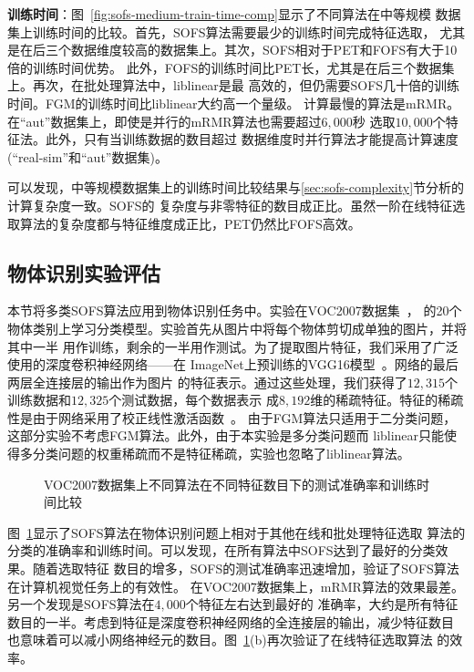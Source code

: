 \documentclass[doctor]{ustcthesis}
\newcommand{\includeMyGraphicX}[1]{\texttt{[image: \#1]}}
\begin{document}
\textbf{训练时间}：图~\ref{fig:sofs-medium-train-time-comp}显示了不同算法在中等规模
数据集上训练时间的比较。首先，SOFS算法需要最少的训练时间完成特征选取，
尤其是在后三个数据维度较高的数据集上。其次，SOFS相对于PET和FOFS有大于10倍的训练时间优势。
此外，FOFS的训练时间比PET长，尤其是在后三个数据集上。再次，在批处理算法中，liblinear是最
高效的，但仍需要SOFS几十倍的训练时间。FGM的训练时间比liblinear大约高一个量级。
计算最慢的算法是mRMR。在``aut''数据集上，即使是并行的mRMR算法也需要超过$6,000$秒
选取$10,000$个特征法。此外，只有当训练数据的数目超过
数据维度时并行算法才能提高计算速度(``real-sim''和``aut''数据集)。

可以发现，中等规模数据集上的训练时间比较结果与\ref{sec:sofs-complexity}节分析的计算复杂度一致。SOFS的
复杂度与非零特征的数目成正比。虽然一阶在线特征选取算法的复杂度都与特征维度成正比，PET仍然比FOFS高效。

\subsection{物体识别实验评估}
本节将多类SOFS算法应用到物体识别任务中。实验在VOC2007数据集~\cite{pascal-voc-2007}，
的20个物体类别上学习分类模型。实验首先从图片中将每个物体剪切成单独的图片，并将其中一半
用作训练，剩余的一半用作测试。为了提取图片特征，我们采用了广泛使用的深度卷积神经网络——在
ImageNet上预训练的VGG16模型~\cite{simonyan2014very}。网络的最后两层全连接层的输出作为图片
的特征表示。通过这些处理，我们获得了$12,315$个训练数据和$12,325$个测试数据，每个数据表示
成$8,192$维的稀疏特征。特征的稀疏性是由于网络采用了校正线性激活函数~\cite{krizhevsky2012imagenet}。
由于FGM算法只适用于二分类问题，这部分实验不考虑FGM算法。此外，由于本实验是多分类问题而
liblinear只能使得多分类问题的权重稀疏而不是特征稀疏，实验也忽略了liblinear算法。

\begin{figure}
    \centerline{
        \subfigure[测试准确率]{ \includeMyGraphicX{voc2007-fs-test-accuracy.pdf} }
        \subfigure[训练时间]{ \includeMyGraphicX{voc2007-fs-train-time.pdf} }
    }
    \caption{VOC2007数据集上不同算法在不同特征数目下的测试准确率和训练时间比较}
    \label{fig:sofs-voc-comp}
    \vspace{-2em}
\end{figure}
图~\ref{fig:sofs-voc-comp}显示了SOFS算法在物体识别问题上相对于其他在线和批处理特征选取
算法的分类的准确率和训练时间。可以发现，在所有算法中SOFS达到了最好的分类效果。随着选取特征
数目的增多，SOFS的测试准确率迅速增加，验证了SOFS算法在计算机视觉任务上的有效性。
在VOC2007数据集上，mRMR算法的效果最差。另一个发现是SOFS算法在$4,000$个特征左右达到最好的
准确率，大约是所有特征数目的一半。考虑到特征是深度卷积神经网络的全连接层的输出，减少特征数目
也意味着可以减小网络神经元的数目。图~\ref{fig:sofs-voc-comp}(b)再次验证了在线特征选取算法
的效率。
\end{document}
